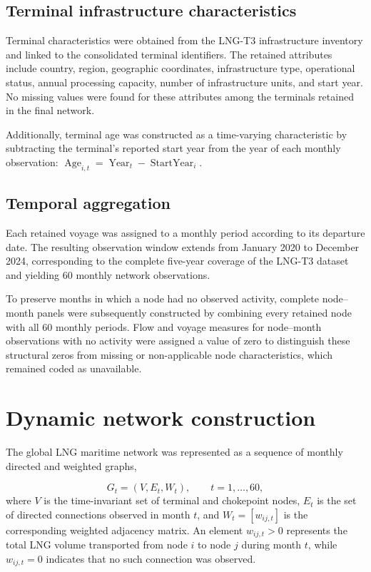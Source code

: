 \documentclass[pdftex,12pt,openright,a4paper,oneside]{book}
\begin{document}
\subsection{Terminal infrastructure characteristics}
\label{subsec:terminal_roles_characteristics}
Terminal characteristics were obtained from the LNG-T3 infrastructure inventory and linked to the consolidated terminal identifiers. 
The retained attributes include country, region, geographic coordinates, infrastructure type, operational status, annual processing capacity, number of infrastructure units, and start year. 
No missing values were found for these attributes among the terminals retained in the final network.

Additionally, terminal age was constructed as a time-varying characteristic by subtracting the terminal's reported start year from the year of each monthly observation:
$ \operatorname{Age}_{i,t}
=
\operatorname{Year}_{t}
-
\operatorname{StartYear}_{i}.
\label{eq:terminal_age}$

\subsection{Temporal aggregation}
\label{subsec:temporal_aggregation}
Each retained voyage was assigned to a monthly period according to its departure date. 
The resulting observation window extends from January 2020 to December 2024, corresponding to the complete five-year coverage of the LNG-T3 dataset and yielding 60 monthly network observations. 

To preserve months in which a node had no observed activity, complete node--month panels were subsequently constructed by combining every retained node with all 60 monthly periods. 
Flow and voyage measures for node--month observations with no activity were assigned a value of zero to distinguish these structural zeros from missing or non-applicable node characteristics, which remained coded as unavailable.

\section{Dynamic network construction} 
\label{sec:dynamic_network_construction} 
The global LNG maritime network was represented as a sequence of monthly directed and weighted graphs, 

\begin{equation*} 
    G_t = (V,E_t,W_t), \qquad t=1,\ldots,60, 
    \label{eq:dynamic_network} 
\end{equation*}
where \(V\) is the time-invariant set of terminal and chokepoint nodes, \(E_t\) is the set of directed connections observed in month \(t\), and \(W_t=[w_{ij,t}]\) is the corresponding weighted adjacency matrix. 
An element \(w_{ij,t}>0\) represents the total LNG volume transported from node \(i\) to node \(j\) during month \(t\), while \(w_{ij,t}=0\) indicates that no such connection was observed.
\end{document}
